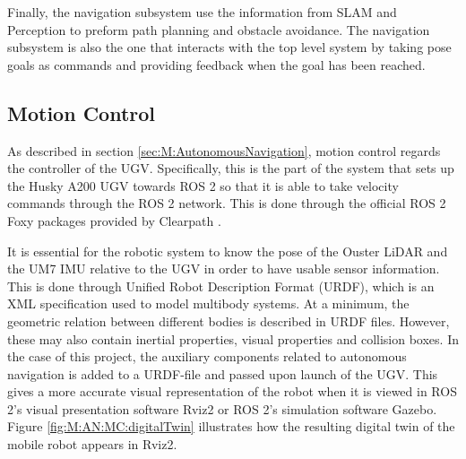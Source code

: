 Finally, the navigation subsystem use the information from SLAM and Perception to preform path planning and obstacle avoidance. The navigation subsystem is also the one that interacts with the top level system by taking pose goals as commands and providing feedback when the goal has been reached.

\subsection{Motion Control}\label{sec:M:AN:MotionControl}
As described in section \ref{sec:M:AutonomousNavigation}, motion control regards the controller of the UGV. Specifically, this is the part of the system that sets up the Husky A200 UGV towards ROS 2 so that it is able to take velocity commands through the ROS 2 network. This is done through the official ROS 2 Foxy packages provided by Clearpath \cite{husky_repo}.


It is essential for the robotic system to know the pose of the Ouster LiDAR and the UM7 IMU relative to the UGV in order to have usable sensor information. This is done through Unified Robot Description Format (URDF), which is an XML specification used to model multibody systems. At a minimum, the geometric relation between different bodies is described in URDF files. However, these may also contain inertial properties, visual properties and collision boxes. In the case of this project, the auxiliary components related to autonomous navigation is added to a URDF-file and passed upon launch of the UGV. This gives a more accurate visual representation of the robot when it is viewed in ROS 2's visual presentation software Rviz2 or ROS 2's simulation software Gazebo. Figure \ref{fig:M:AN:MC:digitalTwin} illustrates how the resulting digital twin of the mobile robot appears in Rviz2.

